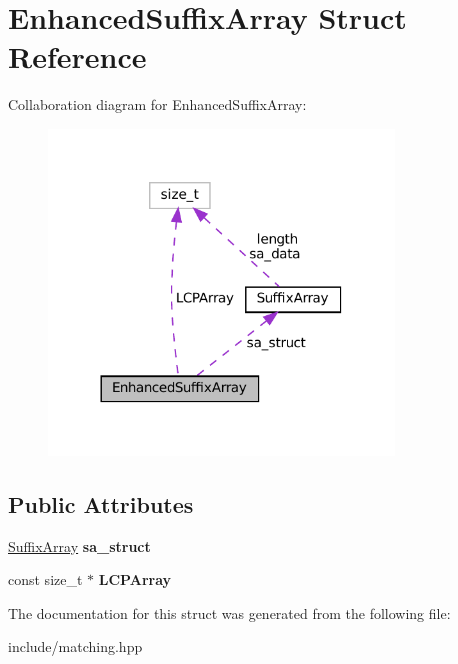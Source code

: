 \hypertarget{structEnhancedSuffixArray}{}\section{Enhanced\+Suffix\+Array Struct Reference}
\label{structEnhancedSuffixArray}


Collaboration diagram for Enhanced\+Suffix\+Array\+:\nopagebreak
\begin{figure}[H]
\begin{center}
\leavevmode
\includegraphics[width=260pt]{structEnhancedSuffixArray__coll__graph}
\end{center}
\end{figure}
\subsection*{Public Attributes}
\begin{DoxyCompactItemize}
\item 
\mbox{\label{structEnhancedSuffixArray_a759e0da6c0567b61114606061bd07953}} 
\mbox{\hyperlink{structSuffixArray}{Suffix\+Array}} {\bfseries sa\+\_\+struct}
\item 
\mbox{\label{structEnhancedSuffixArray_a7e795867c7d43ef6f7a7b4f1963d45c2}} 
const size\+\_\+t $\ast$ {\bfseries L\+C\+P\+Array}
\end{DoxyCompactItemize}


The documentation for this struct was generated from the following file\+:\begin{DoxyCompactItemize}
\item 
include/matching.\+hpp\end{DoxyCompactItemize}
